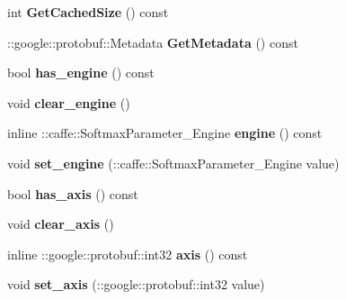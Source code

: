 \begin{DoxyCompactItemize}
int {\bfseries Get\+Cached\+Size} () const
\item 
\mbox{\label{classcaffe_1_1_softmax_parameter_a2f1373f337eb97ad96fb2fb54b16ad75}} 
\+::google\+::protobuf\+::\+Metadata {\bfseries Get\+Metadata} () const
\item 
\mbox{\label{classcaffe_1_1_softmax_parameter_ab7f17271ce5bcf33d1c4c5d8ef1f38ea}} 
bool {\bfseries has\+\_\+engine} () const
\item 
\mbox{\label{classcaffe_1_1_softmax_parameter_a4b09c5782df4c21c0ed9692cf2a87234}} 
void {\bfseries clear\+\_\+engine} ()
\item 
\mbox{\label{classcaffe_1_1_softmax_parameter_a58f0856eacba787a6d6a24fac07055c6}} 
inline \+::caffe\+::\+Softmax\+Parameter\+\_\+\+Engine {\bfseries engine} () const
\item 
\mbox{\label{classcaffe_1_1_softmax_parameter_a24de52a2fc9d1de33c85ba31747318ab}} 
void {\bfseries set\+\_\+engine} (\+::caffe\+::\+Softmax\+Parameter\+\_\+\+Engine value)
\item 
\mbox{\label{classcaffe_1_1_softmax_parameter_a6b932eca1f1df736197d37c6c360ba8e}} 
bool {\bfseries has\+\_\+axis} () const
\item 
\mbox{\label{classcaffe_1_1_softmax_parameter_aac31e961bf87522946bf10fb6b8bd8b7}} 
void {\bfseries clear\+\_\+axis} ()
\item 
\mbox{\label{classcaffe_1_1_softmax_parameter_a6964cf4c3002b819fcc0d9b5e9c88601}} 
inline \+::google\+::protobuf\+::int32 {\bfseries axis} () const
\item 
\mbox{\label{classcaffe_1_1_softmax_parameter_a9142f993e06a0c1bf7a9c0de29f2cdd3}} 
void {\bfseries set\+\_\+axis} (\+::google\+::protobuf\+::int32 value)
\item 
\mbox{\label{classcaffe_1_1_softmax_parameter_ae73bd08a4ce30b542d1fae233c06bf23}} 

\end{DoxyCompactItemize}

